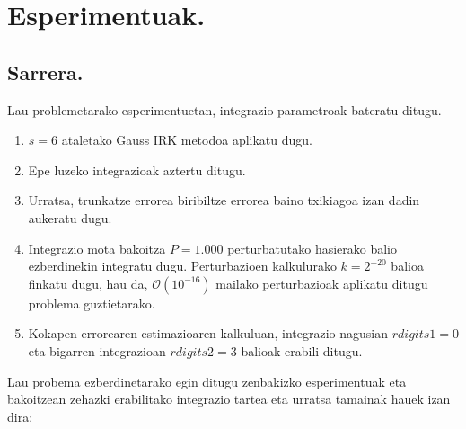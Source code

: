 \section{Esperimentuak.}

\subsection{Sarrera.}

Lau problemetarako esperimentuetan, integrazio parametroak bateratu ditugu. 

\begin{enumerate}

\item $s=6$ ataletako Gauss IRK metodoa aplikatu dugu.

\item Epe luzeko integrazioak aztertu ditugu.

\item Urratsa, trunkatze errorea biribiltze errorea baino txikiagoa izan dadin aukeratu dugu. 

\item Integrazio mota bakoitza $P=1.000$ perturbatutako hasierako balio ezberdinekin integratu dugu. Perturbazioen kalkulurako $k=2^{-20}$ balioa finkatu dugu, hau da, $\mathcal{O}(10^{-16})$   mailako perturbazioak aplikatu ditugu problema guztietarako.  

\item Kokapen errorearen estimazioaren kalkuluan, integrazio nagusian $rdigits1=0$ eta bigarren integrazioan $rdigits2=3$ balioak erabili ditugu.

\end{enumerate}

Lau probema ezberdinetarako egin ditugu zenbakizko esperimentuak eta bakoitzean zehazki erabilitako integrazio tartea eta urratsa tamainak hauek izan dira:

